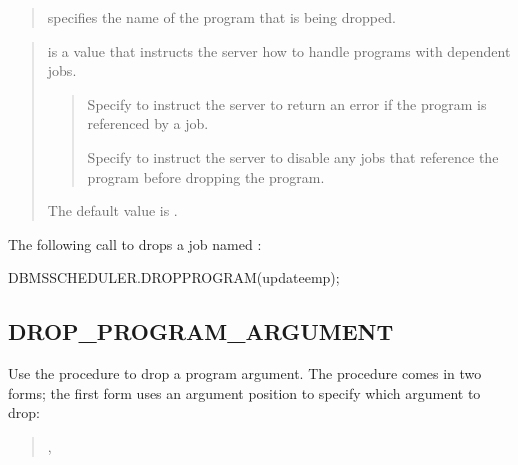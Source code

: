 \documentclass[letterpaper,10pt,english,openany,oneside]{sphinxmanual}
\begin{document}

\begin{quote}

 specifies the name of the program that is being
dropped.
\end{quote}

\begin{quote}

 is a  value that instructs the server how to handle
programs with dependent jobs.
\begin{quote}

Specify  to instruct the server to return an error if the
program is referenced by a job.

Specify  to instruct the server to disable any jobs that
reference the program before dropping the program.
\end{quote}

The default value is .
\end{quote}


The following call to  drops a job named :

%
\begin{sphinxVerbatim}[commandchars=\\\{\}]
DBMS\PYGZus{}SCHEDULER.DROP\PYGZus{}PROGRAM(\PYGZsq{}update\PYGZus{}emp\PYGZsq{});
\end{sphinxVerbatim}

\newpage


\subsection{DROP\_PROGRAM\_ARGUMENT}
\label{\detokenize{drop_program_argument::doc}}\label{\detokenize{drop_program_argument:drop-program-argument}}
Use the  procedure to drop a program argument.
The  procedure comes in two forms; the first form
uses an argument position to specify which argument to drop:
\begin{quote}

\begin{DUlineblock}{0em}
\item[] 
\item[] ,
\item[] 
\end{DUlineblock}
\end{quote}
\end{document}
